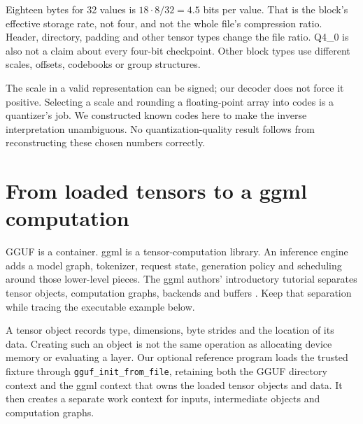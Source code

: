Eighteen bytes for 32 values is $18\cdot8/32=4.5$ bits per value.
That is the block's effective storage rate, not four, and not the
whole file's compression ratio. Header, directory, padding and other
tensor types change the file ratio. Q4\_0 is also not a claim about
every four-bit checkpoint. Other block types use different
scales, offsets, codebooks or group structures.

The scale in a valid representation can be signed; our decoder
does not force it positive. Selecting a scale and rounding a
floating-point array into codes is a quantizer's job. We constructed
known codes here to make the inverse interpretation unambiguous.
No quantization-quality result follows from reconstructing these
chosen numbers correctly.

\section{From loaded tensors to a ggml computation}
GGUF is a container. ggml is a tensor-computation library. An
inference engine adds a model graph, tokenizer, request state,
generation policy and scheduling around those lower-level pieces.
The ggml authors' introductory tutorial separates tensor objects,
computation graphs, backends and buffers \cite{nguyen2024ggmlintro}.
Keep that separation while tracing the executable example below.

A tensor object records type, dimensions, byte strides and the
location of its data. Creating such an object is not the same
operation as allocating device memory or evaluating a layer.
Our optional reference program loads the trusted fixture through
\texttt{gguf\_init\_from\_file}, retaining both the GGUF directory
context and the ggml context that owns the loaded tensor objects
and data. It then creates a separate work context for inputs,
intermediate objects and computation graphs.


